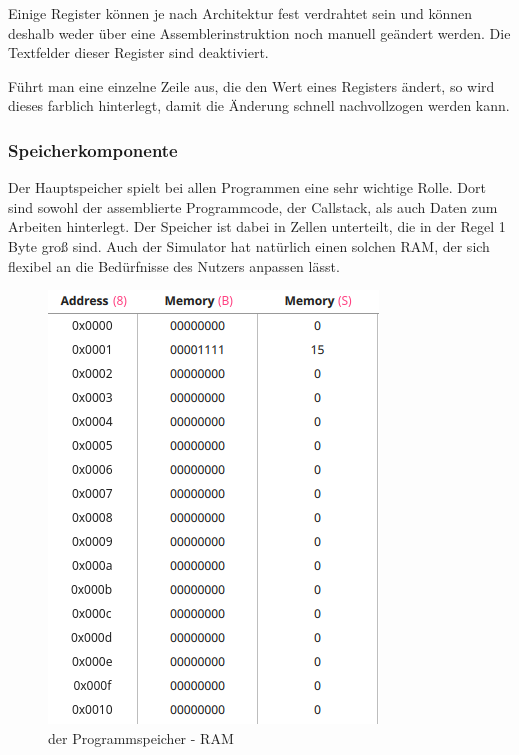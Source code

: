 Einige Register können je nach Architektur fest verdrahtet sein und können deshalb weder über eine Assemblerinstruktion noch manuell geändert werden. Die Textfelder dieser Register sind deaktiviert.

Führt man eine einzelne Zeile aus, die den Wert eines Registers ändert, so wird dieses farblich hinterlegt, damit die Änderung schnell nachvollzogen werden kann.


\subsubsection{Speicherkomponente}
Der Hauptspeicher spielt bei allen Programmen eine sehr wichtige Rolle.
Dort sind sowohl der assemblierte Programmcode, der Callstack, als auch Daten zum Arbeiten hinterlegt.
Der Speicher ist dabei in Zellen unterteilt, die in der Regel 1 Byte groß sind.
Auch der Simulator hat natürlich einen solchen RAM, der sich flexibel an die Bedürfnisse des Nutzers anpassen lässt.

\begin{figure}[ht]
	\centering
  \includegraphics[scale=1]{Images/Memory}
	\caption{der Programmspeicher - RAM}
	\label{Memory}
\end{figure}

